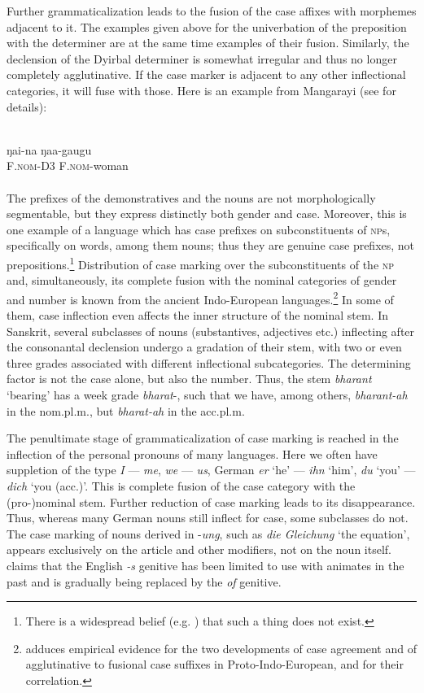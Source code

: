Further grammaticalization leads to the fusion of the case affixes with morphemes adjacent to it. The examples given above for the univerbation of the preposition with the determiner are at the same time examples of their fusion. Similarly, the declension of the Dyirbal determiner is somewhat irregular and thus no longer completely agglutinative. If the case marker is adjacent to any other inflectional categories, it will fuse with those. Here is an example from Mangarayi (see  for details):
  
\ea\label{ex:E61}
\\
\gll ŋai-na  ŋaa-gaugu\\
 F.\textsc{nom}-D3  F.\textsc{nom}-woman\\
\\
\z
\noindent The prefixes of the demonstratives and the nouns are not morphologically segmentable, but they express distinctly both gender and case. Moreover, this is one example of a language which has case prefixes on subconstituents of \textsc{np}s, specifically on words, among them nouns; thus they are genuine case prefixes, not prepositions.\footnote{There is a widespread belief (e.g. \citealt[135--140]{Kahr1976}) that such a thing does not exist.} Distribution of case marking over the subconstituents of the \textsc{np} and, simultaneously, its complete fusion with the nominal categories of gender and number is known from the ancient Indo-European languages.\footnote{\citet{Haudry1980} adduces empirical evidence for the two developments of case agreement and of agglutinative to fusional case suffixes in Proto-Indo-European, and for their correlation.} In some of them, case inflection even affects the inner structure of the nominal stem. In Sanskrit, several subclasses of nouns (substantives, adjectives etc.) inflecting after the consonantal declension undergo a gradation of their stem, with two or even three grades associated with different inflectional subcategories. The determining factor is not the case alone, but also the number. Thus, the stem \textit{bharant} ‘bearing’ has a week grade \textit{bharat}{}-, such that we have, among others, \textit{bharant-ah} in the nom.pl.m., but \textit{bharat-ah} in the acc.pl.m.

The penultimate stage of grammaticalization of case marking is reached in the inflection of the personal pronouns of many languages. Here we often have suppletion of the type \textit{I} — \textit{me}, \textit{we} — \textit{us}, German \textit{er} ‘he’ — \textit{ihn} ‘him’, \textit{du} ‘you’ — \textit{dich} ‘you (acc.)’. This is complete fusion of the case category with the (pro-)nominal stem. Further reduction of case marking leads to its disappearance. Thus, whereas many German nouns still inflect for case, some subclasses do not. The case marking of nouns derived in -\textit{ung}, such as \textit{die Gleichung} ‘the equation’, appears exclusively on the article and other modifiers, not on the noun itself. \citet[164f]{Sapir1921} claims that the English \textit{{}-s} genitive has been limited to use with animates in the past and is gradually being replaced by the \textit{of} genitive.

